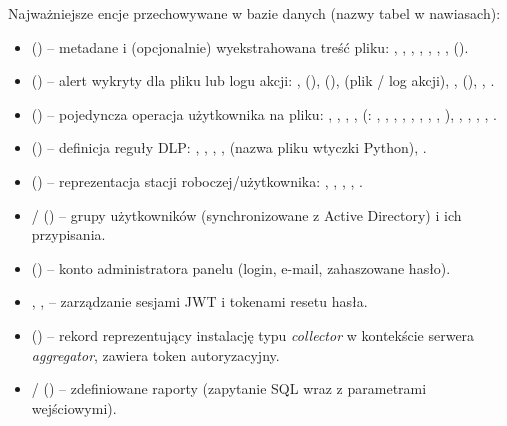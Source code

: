 
Najważniejsze encje przechowywane w bazie danych (nazwy tabel w nawiasach):

\begin{itemize}[leftmargin=1.6em]
  \item {} () -- metadane i (opcjonalnie) wyekstrahowana treść pliku:
        , , , , ,
        , ,  ().
  \item {} () -- alert wykryty dla pliku lub logu akcji:
        ,  (),  (),
         (plik / log akcji), ,  (),
        , .
  \item {} () -- pojedyncza operacja użytkownika na pliku:
        , , , , 
        (: , , , ,
        , , , , ),
        , , , , .
  \item {} () -- definicja reguły DLP: , ,
        , ,  (nazwa pliku wtyczki Python),
        .
  \item {} () -- reprezentacja stacji roboczej/użytkownika: ,
        , , , .
  \item {}/ () -- grupy użytkowników (synchronizowane
        z Active Directory) i ich przypisania.
  \item {} () -- konto administratora panelu (login, e-mail,
        zahaszowane hasło).
  \item {}, ,  -- zarządzanie
        sesjami JWT i tokenami resetu hasła.
  \item {} () -- rekord reprezentujący instalację typu
        \emph{collector} w kontekście serwera \emph{aggregator}, zawiera token autoryzacyjny.
  \item {}/ () -- zdefiniowane raporty
        (zapytanie SQL wraz z parametrami wejściowymi).
\end{itemize}

